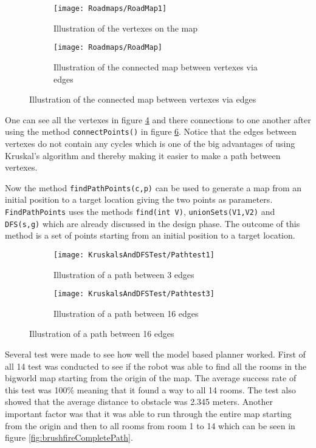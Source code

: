 \documentclass[../Head/Main.tex]{subfiles}
\begin{document}
  \begin{figure}[H]
   \begin{subfigure}[b]{0.49\textwidth}
    \centering
    \texttt{[image: Roadmaps/RoadMap1]}
    \caption{Illustration of the vertexes on the map}
    \label{fig:Vertexes}
  \end{subfigure}
  \hfill
   \begin{subfigure}[b]{0.49\textwidth}
    \centering
    \texttt{[image: Roadmaps/RoadMap]}
    \caption{Illustration of the connected map between vertexes via edges}
    \label{fig:VertexesAndEdges}
  \end{subfigure}
  \end{figure}  
  
One can see all the vertexes in figure \ref{fig:Vertexes} and there connections to one another after using the method \texttt{connectPoints()} in figure \ref{fig:VertexesAndEdges}. Notice that the edges between vertexes do not contain any cycles which is one of the big advantages of using Kruskal's algorithm and thereby making it easier to make a path between vertexes.  

Now the method \texttt{findPathPoints(c,p)} can be used to generate a map from an initial position to a target location giving the two points as parameters. \texttt{FindPathPoints} uses the methods \texttt{find(int V)}, \texttt{unionSets(V1,V2)} and \texttt{DFS(s,g)} which are already discussed in the design phase. The outcome of this method is a set of points starting from an initial position to a target location.        

  \begin{figure}[H]
   \begin{subfigure}[b]{0.49\textwidth}
    \centering
    \texttt{[image: KruskalsAndDFSTest/Pathtest1]}
    \caption{Illustration of a path between 3 edges}
    \label{fig:Vertexes}
  \end{subfigure}
  \hfill
   \begin{subfigure}[b]{0.49\textwidth}
    \centering
    \texttt{[image: KruskalsAndDFSTest/Pathtest3]}
    \caption{Illustration of a path between 16 edges}
    \label{fig:VertexesAndEdges}
  \end{subfigure}
  \end{figure}  

Several test were made to see how well the model based planner worked. First of all 14 test was conducted to see if the robot was able to find all the rooms in the bigworld map starting from the origin of the map. The average success rate of this test was 100\% meaning that it found a way to all 14 rooms. The test also showed that the average distance to obstacle was 2.345 meters. Another important factor was that it was able to run through the entire map starting from the origin and then to all rooms from room 1 to 14 which can be seen in figure \ref{fig:brushfireCompletePath}. 
\end{document}
